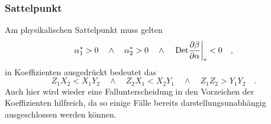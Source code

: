      \subsubsection{Sattelpunkt}\label{beta_QCDxdQCD:fix4:Sattelpunkt}
      Am physikalischen Sattelpunkt muss gelten
      \begin{equation}
      \alpha_1^* > 0 \quad \land \quad
      \alpha_2^* > 0 \quad \land \quad
      \left. \text{Det} \frac{\partial \beta}{\partial \alpha} \right |_* < 0  \quad ,
      \label{eq:beta_QCDxdQCD:alpha4_Sattelpunkt}
      \end{equation}
      in Koeffizienten ausgedrückt bedeutet das 
      \begin{equation}
       Z_1 X_2 < X_1 Y_2 \quad \land \quad Z_2 X_1 < X_2 Y_1 \quad \land \quad 
       Z_1 Z_2 > Y_1Y_2\quad .
       \label{eq:beta_QCDxdQCD:sattelpunkt}
      \end{equation}
      Auch hier wird wieder eine Fallunterscheidung in den Vorzeichen der 
      Koeffizienten hilfreich, da so einige Fälle bereits 
      darstellungsunabhängig ausgeschlossen werden können.
      
